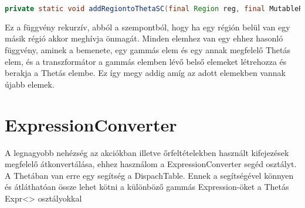 \begin{lstlisting}[language=java ,breaklines=true]
private static void addRegiontoThetaSC(final Region reg, final MutableRegion r) 
\end{lstlisting}

Ez a függvény rekurzív, abból a szempontból, hogy ha egy régión belül van egy másik régió akkor meghívja önmagát. Minden elemhez van egy ehhez hasonló függvény, aminek a bemenete, egy gammás elem és egy annak megfelelő Thetás elem, és a transzformátor a gammás elemben lévő belső elemeket létrehozza és berakja a Thetás elembe. Ez így megy addig amíg az adott elemekben vannak újabb elemek.

\section{ExpressionConverter}

A legnagyobb nehézség az akciókban illetve őrfeltételekben használt kifejezések megfelelő átkonvertálása, ehhez használom a ExpressionConverter segéd osztályt. A Thetában van erre egy segítség a DispachTable. Ennek a segítségével könnyen és átláthatóan össze lehet kötni a különböző gammás Expression-öket a Thetás Expr<> osztályokkal
